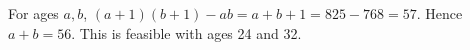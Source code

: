 For ages $a,b$, $(a+1)(b+1)-ab=a+b+1=825-768=57$. Hence $\boxed{a+b=56}$. This is feasible with ages 24 and 32.
